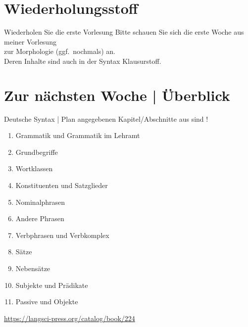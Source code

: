 \section{Wiederholungsstoff}

\begin{frame}
  {Wiederholen Sie die erste Vorlesung }
  \Zeile
  \centering 
  Bitte schauen Sie sich die erste Woche aus meiner Vorlesung\\
  zur Morphologie (ggf.\ nochmals) an.\\
  \Zeile
  Deren Inhalte sind auch in der Syntax Klausurstoff.\\
\end{frame}

\ifdefined\TITLE
  \section{Zur nächsten Woche | Überblick}

  \begin{frame}
    {Deutsche Syntax | Plan}
     angegebenen Kapitel\slash Abschnitte aus  sind !\\
    \Halbzeile
    \begin{enumerate}
      \item Grammatik und Grammatik im Lehramt 
      \item \alert{Grundbegriffe} 
      \item Wortklassen 
      \item Konstituenten und Satzglieder 
      \item Nominalphrasen 
      \item Andere Phrasen 
      \item Verbphrasen und Verbkomplex 
      \item Sätze  
      \item Nebensätze 
      \item Subjekte und Prädikate 
      \item Passive und Objekte 
    \end{enumerate}
    \Halbzeile
    \centering 
    \url{https://langsci-press.org/catalog/book/224}
  \end{frame}
\fi
